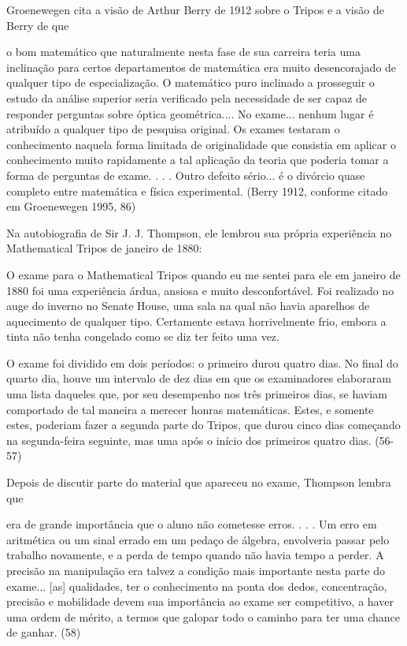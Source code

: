 \documentclass[12pt]{article}
\begin{document}
Groenewegen cita a visão de Arthur Berry de 1912 sobre o Tripos e a visão de Berry de que

o bom matemático que naturalmente nesta fase de sua carreira teria uma inclinação para certos departamentos de matemática era muito desencorajado de qualquer tipo de especialização. O matemático puro inclinado a prosseguir o estudo da análise superior seria verificado pela necessidade de ser capaz de responder perguntas sobre óptica geométrica.... No exame... nenhum lugar é atribuído a qualquer tipo de pesquisa original. Os exames testaram o conhecimento naquela forma limitada de originalidade que consistia em aplicar o conhecimento muito rapidamente a tal aplicação da teoria que poderia tomar a forma de perguntas de exame. . . . Outro defeito sério... é o divórcio quase completo entre matemática e física experimental. (Berry 1912, conforme citado em Groenewegen 1995, 86)

Na autobiografia de Sir J. J. Thompson, ele lembrou sua própria experiência no Mathematical Tripos de janeiro de 1880:

O exame para o Mathematical Tripos quando eu me sentei para ele em janeiro de 1880 foi uma experiência árdua, ansiosa e muito desconfortável. Foi realizado no auge do inverno no Senate House, uma sala na qual não havia aparelhos de aquecimento de qualquer tipo. Certamente estava horrivelmente frio, embora a tinta não tenha congelado como se diz ter feito uma vez.

O exame foi dividido em dois períodos: o primeiro durou quatro dias. No final do quarto dia, houve um intervalo de dez dias em que os examinadores elaboraram uma lista daqueles que, por seu desempenho nos três primeiros dias, se haviam comportado de tal maneira a merecer honras matemáticas. Estes, e somente estes, poderiam fazer a segunda parte do Tripos, que durou cinco dias começando na segunda-feira seguinte, mas uma após o início dos primeiros quatro dias. (56-57)

Depois de discutir parte do material que apareceu no exame, Thompson lembra que

era de grande importância que o aluno não cometesse erros. . . . Um erro em aritmética ou um sinal errado em um pedaço de álgebra, envolveria passar pelo trabalho novamente, e a perda de tempo quando não havia tempo a perder. A precisão na manipulação era talvez a condição mais importante nesta parte do exame... [as] qualidades, ter o conhecimento na ponta dos dedos, concentração, precisão e mobilidade devem sua importância ao exame ser competitivo, a haver uma ordem de mérito, a termos que galopar todo o caminho para ter uma chance de ganhar. (58)
\end{document}
